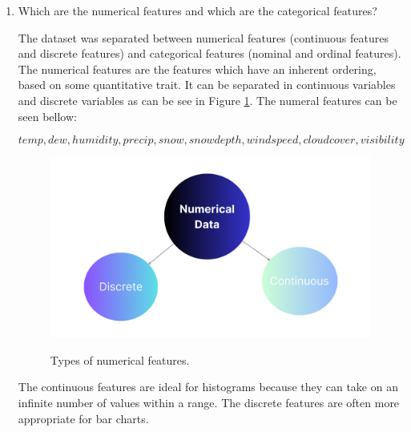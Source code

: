 \documentclass{article}
\begin{document}
\begin{enumerate}
\item Which are the numerical features and which are the categorical features? 

The dataset was separated between numerical features (continuous features and discrete features) and categorical features (nominal and ordinal features).
The numerical features are the features which have an inherent ordering, based on some quantitative trait. It can be separated in continuous variables and discrete variables as can be see in Figure \ref{fig:numerical}. The numeral features can be seen bellow:

\begin{equation}
temp, dew, humidity, precip, snow, snowdepth, windspeed,
cloudcover, visibility
\label{eq:1}
\end{equation}

\begin{figure}[H]
		\centering
		\caption{Types of numerical features.}
		\includegraphics[width=0.5\linewidth]{Report/Images/NumericalData.png}
	\label{fig:numerical}
	\end{figure}

The continuous features are ideal for histograms because they can take on an infinite number of values within a range. The discrete features are often more appropriate for bar charts. 


    
     


\end{enumerate}
\end{document}
